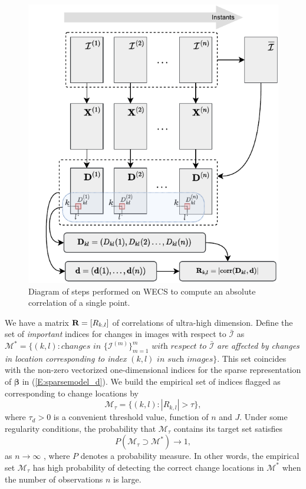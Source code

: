\documentclass[journal]{IEEEtran}
\newcommand{\vbeta}{\pmb{\beta}}
\newcommand{\vR}{{\textbf R}}
\begin{document}
\begin{figure}[htb!]
\centering
\includegraphics[scale=.8]{../../drawio/diagram_wecs.drawio_11nov21}
\caption{Diagram of steps performed on WECS to compute an absolute correlation of a single point.}
\label{F:EllipsoidChanges}
\end{figure}


We have a matrix $\vR=[R_{k,l}]$ of correlations of ultra-high dimension. Define the set of 
{\it important} indices for changes in images with respect to $\bar{\mathcal I}$ as 
$\mathcal{M}^{*}=\{(k,l): \textit{changes in } \{\mathcal{I}^{(m)}\}_{m=1}^m \textit{ with respect to}$ $\bar{\mathcal{I}}$ \textit{are affected by changes in location corresponding to index} $(k,l)$ $\textit{in such images}\}$.  This set coincides with the non-zero vectorized one-dimensional indices for the sparse representation of $\vbeta$ in (\ref{E:sparsemodel_d}). 
We build the empirical set of indices flagged as corresponding to change locations by
\begin{equation}
\mathcal{M}_{\tau}=\{(k,l):|R_{k,l}|>\tau\},
\label{E:def_Mtaud}
\end{equation}
where $\tau_d>0$ is a convenient threshold value, function of $n$ and $J$. Under some regularity conditions, the probability that $\mathcal{M}_{\tau}$ contains its target set satisfies
\[
P(\mathcal{M}_{\tau}\supset\mathcal{M}^{*})\rightarrow 1,
\]
as $n\rightarrow\infty$ \cite{fan2020statistical}, where $P$ denotes a probability measure. In other words, the empirical set $\mathcal{M}_{\tau}$ has high probability of detecting the correct change locations in $\mathcal{M}^{*}$ when the number of observations $n$ is large.
\end{document}
